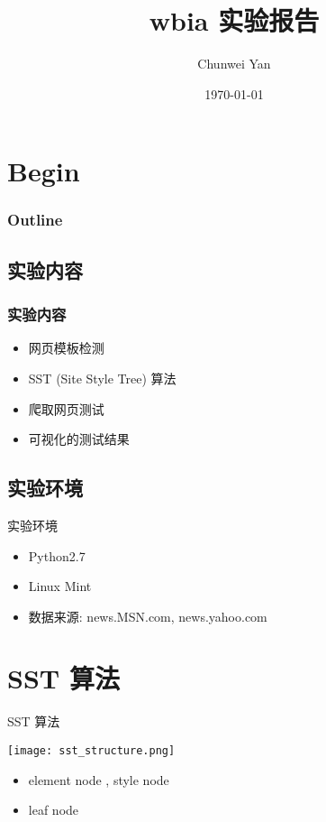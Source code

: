 \documentclass{beamer}
\title{wbia 实验报告}
\author{Chunwei Yan}
\institute[PKUSZ]{
\texttt{YanChunwei@outlook.com}
}
\date{\today}
\begin{document}
\begin{frame}
  \titlepage
\end{frame}

\section{Begin}
\begin{frame}
\frametitle{Outline}
\tableofcontents
\end{frame}
\subsection{实验内容}
\begin{frame}
\frametitle{实验内容}
    \begin {itemize} 
    \item 网页模板检测
    \pause
    \item SST (Site Style Tree) 算法
    \pause
    \item 爬取网页测试
    \pause
    \item 可视化的测试结果
    \pause
    \end{itemize}
\end{frame}

\subsection{实验环境}
\begin{frame}{实验环境}
    \begin{itemize}
    \item Python2.7
    \pause
    \item Linux Mint
    \pause
    \item 数据来源: news.MSN.com, news.yahoo.com
    \end{itemize}
\end{frame}

\section{SST 算法}
\begin{frame}{SST 算法}
    \begin{center}
    \texttt{[image: sst\_structure.png]}
    \end{center}
    \pause
    \begin{itemize}
        \item element node , style node
    \pause
        \item {\color{blue} leaf node}
    \end{itemize}
\end{frame}
\end{document}
